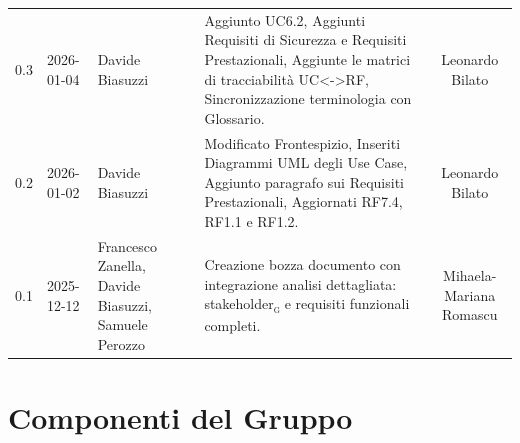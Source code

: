 \documentclass[a4paper, 11pt, oneside]{scrartcl} %
\begin{document}
\begin{center}
{\begin{tabular}{@{}llp{}p{}c@{}}
            0.3               & 2026-01-04    & Davide Biasuzzi                                     & Aggiunto UC6.2, Aggiunti Requisiti di Sicurezza e Requisiti Prestazionali, Aggiunte le matrici di tracciabilità UC<->RF, Sincronizzazione terminologia con Glossario.                                                                               & Leonardo Bilato         \\
            0.2               & 2026-01-02    & Davide Biasuzzi                                     & Modificato Frontespizio, Inseriti Diagrammi UML degli Use Case, Aggiunto paragrafo sui Requisiti Prestazionali, Aggiornati RF7.4, RF1.1 e RF1.2.                                                                                                    & Leonardo Bilato         \\
            0.1               & 2025-12-12    & Francesco Zanella, Davide Biasuzzi, Samuele Perozzo & Creazione bozza documento con integrazione analisi dettagliata: stakeholder\textsubscript{\textsc{g}} e requisiti funzionali completi.                                                                                                                                        & Mihaela-Mariana Romascu \\
            \bottomrule
        \end{tabular}
    }
\end{center}

\newpage
\tableofcontents %
\listoffigures
\listoftables
\pagestyle{fancy}

\newpage
\section*{Componenti del Gruppo}
\end{document}
